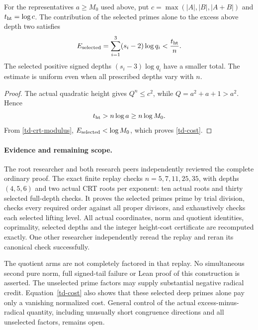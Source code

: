 \begin{proposition}
\label{td-selected-cost}
For the representatives $a\ge M_0$ used above, put
$c=\max(|A|,|B|,|A+B|)$ and $t_{\rm ht}=\log c$. The contribution
of the selected primes alone to the excess above depth two satisfies
\begin{equation}\label{td-cost}
 E_{\rm selected}=\sum_{i=1}^3(s_i-2)\log q_i
       <\frac{t_{\rm ht}}n.
\end{equation}
The selected positive signed depths $(s_i-3)\log q_i$ have a
smaller total. The estimate is uniform even when all prescribed
depths vary with $n$.
\end{proposition}
\begin{proof}
The actual quadratic height gives $Q^n\le c^2$, while
$Q=a^2+a+1>a^2$. Hence
\[
 t_{\rm ht}>n\log a\ge n\log M_0.
\]
From \eqref{td-crt-modulus},
$E_{\rm selected}<\log M_0$, which proves \eqref{td-cost}.
\end{proof}

\paragraph{Evidence and remaining scope.}
The root researcher and both research peers independently reviewed the
complete ordinary proof. The exact finite replay checks
$n=5,7,11,25,35$, with depths $(4,5,6)$ and two actual CRT roots
per exponent: ten actual roots and thirty selected full-depth checks.
It proves the selected primes prime by trial division, checks every
required order against all proper divisors, and exhaustively checks
each selected lifting level. All actual coordinates, norm and quotient
identities, coprimality, selected depths and the integer height-cost
certificate are recomputed exactly. One other researcher independently
reread the replay and reran its canonical check successfully.

The quotient arms are not completely factored in that replay. No
simultaneous second pure norm, full signed-tail failure or Lean proof
of this construction is asserted. The unselected prime factors may
supply substantial negative radical credit. Equation~\eqref{td-cost}
also shows that these selected deep primes alone pay only a vanishing
normalized cost. General control of the actual excess-minus-radical
quantity, including unusually short congruence directions and all
unselected factors, remains open.
